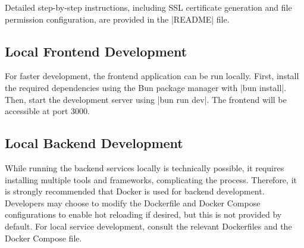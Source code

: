 Detailed step-by-step instructions, including SSL certificate generation and file permission configuration, are provided in the \inline|README| file.

\subsection{Local Frontend Development}
\label{sec:local-frontend-development}

For faster development, the frontend application can be run locally. First, install the required dependencies using the Bun package manager with \inline|bun install|. Then, start the development server using \inline|bun run dev|. The frontend will be accessible at port 3000.

\subsection{Local Backend Development}
\label{sec:local-backend-development}

While running the backend services locally is technically possible, it requires installing multiple tools and frameworks, complicating the process. Therefore, it is strongly recommended that Docker is used for backend development. Developers may choose to modify the Dockerfile and Docker Compose configurations to enable hot reloading if desired, but this is not provided by default. For local service development, consult the relevant Dockerfiles and the Docker Compose file.
